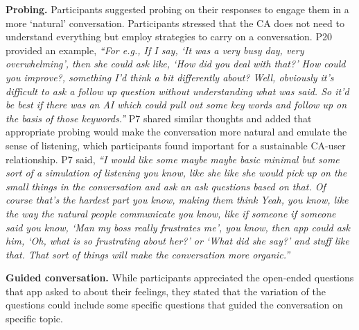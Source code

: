         
        \textbf{Probing. }
        Participants suggested probing on their responses to engage them in a more `natural' conversation. Participants stressed that the \ac{CA} does not need to understand everything but employ strategies to carry on a conversation.
        P20 provided an example,
        \textit{``For e.g., If I say, `It was a very busy day, very overwhelming', then she could ask like, `How did you deal with that?' How could you improve?, something I’d think a bit differently about? 
        Well, obviously it’s difficult to ask a follow up question without understanding what was said. 
        So it’d be best if there was an \ac{AI} which could pull out some key words and follow up on the basis of those keywords.''}
        P7 shared similar thoughts and added that appropriate probing would make the conversation more natural and emulate the sense of listening, which participants found important for a sustainable \ac{CA}-user relationship. P7 said,
       \textit{``I would like some maybe maybe basic minimal but some sort of a simulation of listening you know, like she like she would pick up on the small things in the conversation and ask an ask questions based on that. 
        Of course that's the hardest part you know, making them think Yeah, you know, like the way the natural people communicate you know, like if someone if someone said you know, `Man my boss really frustrates me', you know, then \acl{app} could ask him, `Oh, what is so frustrating about her?' or `What did she say?' and stuff like that. That sort of things will make the conversation more organic.''}
   

        
        \textbf{Guided conversation. }
        While participants appreciated the open-ended questions that \acl{app} asked to about their feelings, they stated that the variation of the questions could include some specific questions that guided the conversation on specific topic.

